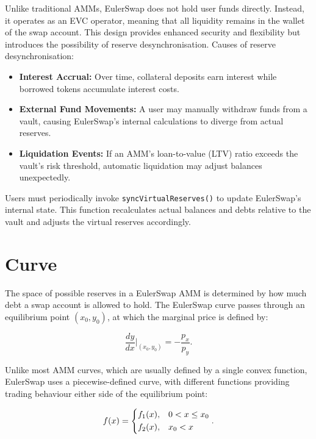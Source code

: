 \documentclass{article}
\begin{document}
Unlike traditional AMMs, EulerSwap does not hold user funds directly. Instead, it operates as an EVC operator, meaning that all liquidity remains in the wallet of the swap account. This design provides enhanced security and flexibility but introduces the possibility of reserve desynchronisation. Causes of reserve desynchronisation:

\begin{itemize}
    \item \textbf{Interest Accrual:} Over time, collateral deposits earn interest while borrowed tokens accumulate interest costs.
    \item \textbf{External Fund Movements:} A user may manually withdraw funds from a vault, causing EulerSwap’s internal calculations to diverge from actual reserves.
    \item \textbf{Liquidation Events:} If an AMM’s loan-to-value (LTV) ratio exceeds the vault’s risk threshold, automatic liquidation may adjust balances unexpectedly.
\end{itemize}

Users must periodically invoke \texttt{syncVirtualReserves()} to update EulerSwap’s internal state. This function recalculates actual balances and debts relative to the vault and adjusts the virtual reserves accordingly.

\section{Curve}

The space of possible reserves in a EulerSwap AMM is determined by how much debt a swap account is allowed to hold. The EulerSwap curve passes through an equilibrium point $(x_0, y_0)$, at which the marginal price is defined by:

\begin{equation}
\frac{dy}{dx} \Big|_{(x_0, y_0)} = -\frac{p_x}{p_y}.
\end{equation}

Unlike most AMM curves, which are usually defined by a single convex function, EulerSwap uses a piecewise-defined curve, with different functions providing trading behaviour either side of the equilibrium point:

\begin{equation}
    \label{eq:fx-main}
    f(x) =
    \begin{dcases}
        f_1(x), 
        & 0 < x \leq x_0 \\
        f_2(x), 
        & x_0 < x
    \end{dcases}.
\end{equation}
\end{document}
